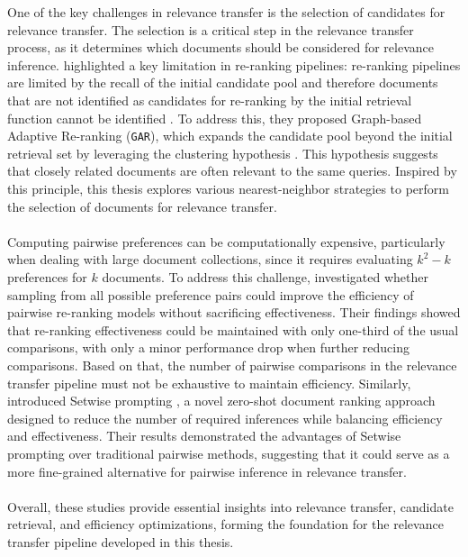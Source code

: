 One of the key challenges in relevance transfer is the selection of candidates for relevance transfer. The selection is a critical step in the relevance transfer process, as it determines which documents should be considered for relevance inference. \citet{macavaney:2022} highlighted a key limitation in re-ranking pipelines: \glqq re-ranking pipelines are limited by the recall of the initial candidate pool and therefore documents that are not identified as candidates for re-ranking by the initial retrieval function cannot be identified \grqq{}. To address this, they proposed Graph-based Adaptive Re-ranking (\texttt{GAR}), which expands the candidate pool beyond the initial retrieval set by leveraging the clustering hypothesis \citep{jardine:1971}. This hypothesis suggests that closely related documents are often relevant to the same queries. Inspired by this principle, this thesis explores various nearest-neighbor strategies to perform the selection of documents for relevance transfer.
\\\\
Computing pairwise preferences can be computationally expensive, particularly when dealing with large document collections, since it requires evaluating $k^2-k$ preferences for $k$ documents. To address this challenge, \citet{gienapp:2022} investigated whether sampling from all possible preference pairs could improve the efficiency of pairwise re-ranking models without sacrificing effectiveness. Their findings showed that re-ranking effectiveness could be maintained with only one-third of the usual comparisons, with only a minor performance drop when further reducing comparisons. Based on that, the number of pairwise comparisons in the relevance transfer pipeline must not be exhaustive to maintain efficiency. Similarly, \citet{zhuang:2024} introduced \glqq Setwise prompting \grqq{}, a novel zero-shot document ranking approach designed to reduce the number of required inferences while balancing efficiency and effectiveness. Their results demonstrated the advantages of Setwise prompting over traditional pairwise methods, suggesting that it could serve as a more fine-grained alternative for pairwise inference in relevance transfer.
\\\\
Overall, these studies provide essential insights into relevance transfer, candidate retrieval, and efficiency optimizations, forming the foundation for the relevance transfer pipeline developed in this thesis.

